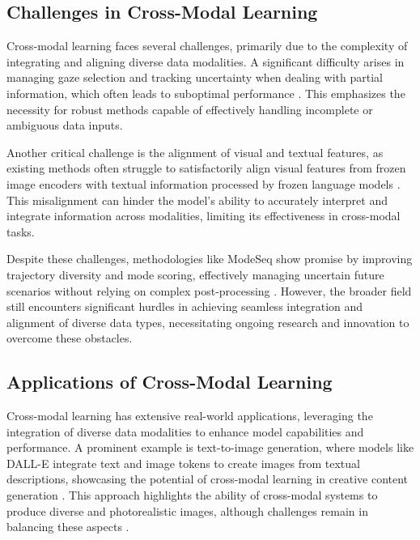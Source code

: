 \subsection{Challenges in Cross-Modal Learning} \label{subsec:Challenges in Cross-Modal Learning}

Cross-modal learning faces several challenges, primarily due to the complexity of integrating and aligning diverse data modalities. A significant difficulty arises in managing gaze selection and tracking uncertainty when dealing with partial information, which often leads to suboptimal performance \cite{denil2011learningattenddeeparchitectures}. This emphasizes the necessity for robust methods capable of effectively handling incomplete or ambiguous data inputs.

Another critical challenge is the alignment of visual and textual features, as existing methods often struggle to satisfactorily align visual features from frozen image encoders with textual information processed by frozen language models \cite{li2023blip}. This misalignment can hinder the model's ability to accurately interpret and integrate information across modalities, limiting its effectiveness in cross-modal tasks.

Despite these challenges, methodologies like ModeSeq show promise by improving trajectory diversity and mode scoring, effectively managing uncertain future scenarios without relying on complex post-processing \cite{zhou2024modeseqtamingsparsemultimodal}. However, the broader field still encounters significant hurdles in achieving seamless integration and alignment of diverse data types, necessitating ongoing research and innovation to overcome these obstacles.

\subsection{Applications of Cross-Modal Learning} \label{subsec:Applications of Cross-Modal Learning}

Cross-modal learning has extensive real-world applications, leveraging the integration of diverse data modalities to enhance model capabilities and performance. A prominent example is text-to-image generation, where models like DALL-E integrate text and image tokens to create images from textual descriptions, showcasing the potential of cross-modal learning in creative content generation \cite{ramesh2021zero}. This approach highlights the ability of cross-modal systems to produce diverse and photorealistic images, although challenges remain in balancing these aspects \cite{Hierarchic5}.

